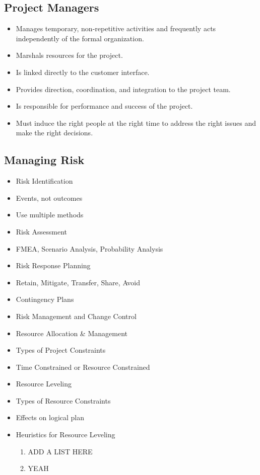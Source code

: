 \documentclass{article}[8pt]
\begin{document}
\begin{multicols}{2}
    \subsection{Project Managers}
    \begin{itemize}
        \item Manages temporary, non-repetitive activities and frequently acts independently of the formal organization.
        \item Marshals resources for the project.
        \item Is linked directly to the customer interface.
        \item Provides direction, coordination, and integration to the project team.
        \item Is responsible for performance and success of the project.
        \item Must induce the right people at the right time to address the right issues and make the right decisions.
    \end{itemize}

    \subsection{Managing Risk}
    \begin{itemize}
        \item Risk Identification
        \item Events, not outcomes
        \item Use multiple methods
        \item Risk Assessment
        \item FMEA, Scenario Analysis,  Probability Analysis
        \item Risk Response Planning
        \item Retain,  Mitigate,  Transfer,  Share,  Avoid
        \item Contingency Plans
        \item Risk Management and Change Control
    \end{itemize}

    \begin{itemize}
        \item Resource Allocation \& Management
        \item Types of Project Constraints
        \item Time Constrained or Resource Constrained
        \item Resource Leveling
        \item Types of Resource Constraints
        \item Effects on logical plan
        \item Heuristics for Resource Leveling
            \begin{enumerate}
                \item ADD A LIST HERE
                \item YEAH
            \end{enumerate}
    \end{itemize}


\end{multicols}
\end{document}
